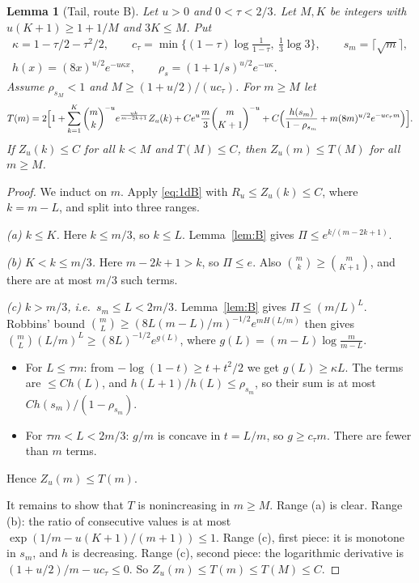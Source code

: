 \documentclass[11pt]{amsart}
\newtheorem{lemma}[theorem]{Lemma}
\theoremstyle{remark}
\begin{document}
\begin{lemma}[Tail, route B]\label{lem:T}
Let $u>0$ and $0<\tau<2/3$. Let $M,K$ be integers with $u(K+1)\ge1+1/M$ and $3K\le M$. Put
\begin{gather*}
\kappa=1-\tau/2-\tau^2/2,\qquad c_\tau=\min\{(1-\tau)\log\tfrac1{1-\tau},\ \tfrac13\log3\},\qquad s_m=\lceil\sqrt m\rceil,\\
h(x)=(8x)^{u/2}e^{-u\kappa x},\qquad \rho_s=(1+1/s)^{u/2}e^{-u\kappa}.
\end{gather*}
Assume $\rho_{s_M}<1$ and $M\ge(1+u/2)/(uc_\tau)$. For $m\ge M$ let
\[T(m)=2\Bigl[1+\sum_{k=1}^{K}\binom mk^{-u}e^{\frac{uk}{m-2k+1}}Z_u(k)+Ce^u\frac m3\binom m{K+1}^{-u}
+C\Bigl(\frac{h(s_m)}{1-\rho_{s_m}}+m(8m)^{u/2}e^{-uc_\tau m}\Bigr)\Bigr].\]
If $Z_u(k)\le C$ for all $k<M$ and $T(M)\le C$, then $Z_u(m)\le T(M)$ for all $m\ge M$.
\end{lemma}
\begin{proof}
We induct on $m$. Apply \eqref{eq:1dB} with $R_u\le Z_u(k)\le C$, where $k=m-L$, and split into three ranges.

\emph{(a) $k\le K$.} Here $k\le m/3$, so $k\le L$. Lemma~\ref{lem:B} gives $\Pi\le e^{k/(m-2k+1)}$.

\emph{(b) $K<k\le m/3$.} Here $m-2k+1>k$, so $\Pi\le e$. Also $\binom mk\ge\binom m{K+1}$, and there are at
most $m/3$ such terms.

\emph{(c) $k>m/3$, i.e.\ $s_m\le L<2m/3$.} Lemma~\ref{lem:B} gives $\Pi\le(m/L)^L$. Robbins' bound
$\binom mL\ge(8L(m-L)/m)^{-1/2}e^{mH(L/m)}$ \cite[Ch.~10, Lemma~7]{MS77} then gives
$\binom mL(L/m)^L\ge(8L)^{-1/2}e^{g(L)}$, where $g(L)=(m-L)\log\frac m{m-L}$.
\begin{itemize}
\item For $L\le\tau m$: from $-\log(1-t)\ge t+t^2/2$ we get $g(L)\ge\kappa L$. The terms are $\le Ch(L)$, and
$h(L+1)/h(L)\le\rho_{s_m}$, so their sum is at most $Ch(s_m)/(1-\rho_{s_m})$.
\item For $\tau m<L<2m/3$: $g/m$ is concave in $t=L/m$, so $g\ge c_\tau m$. There are fewer than $m$ terms.
\end{itemize}
Hence $Z_u(m)\le T(m)$.

It remains to show that $T$ is nonincreasing in $m\ge M$. Range (a) is clear. Range (b): the ratio of
consecutive values is at most $\exp(1/m-u(K+1)/(m+1))\le1$. Range (c), first piece: it is monotone in $s_m$,
and $h$ is decreasing. Range (c), second piece: the logarithmic derivative is
$(1+u/2)/m-uc_\tau\le0$. So $Z_u(m)\le T(m)\le T(M)\le C$.
\end{proof}
\end{document}
